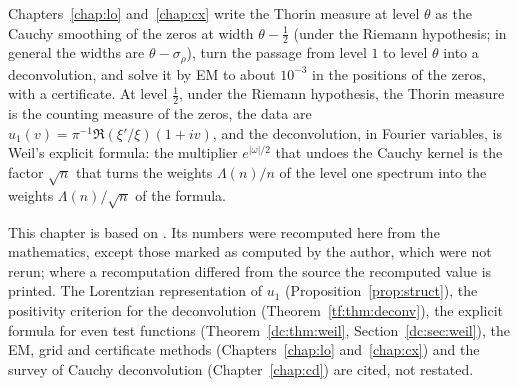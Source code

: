 \label{chap:es}

Chapters~\ref{chap:lo} and~\ref{chap:cx} write the Thorin measure at level $\theta$ as the Cauchy smoothing of the zeros at width $\theta-\tfrac12$ (under the Riemann hypothesis; in general the widths are $\theta-\sigma_\rho$), turn the passage from level $1$ to level $\theta$ into a deconvolution, and solve it by EM to about $10^{-3}$ in the positions of the zeros, with a certificate. At level $\tfrac12$, under the Riemann hypothesis, the Thorin measure is the counting measure of the zeros, the data are $u_1(v)=\pi^{-1}\Re(\xi'/\xi)(1+iv)$, and the deconvolution, in Fourier variables, is Weil's explicit formula: the multiplier $e^{|\omega|/2}$ that undoes the Cauchy kernel is the factor $\sqrt n$ that turns the weights $\Lambda(n)/n$ of the level one spectrum into the weights $\Lambda(n)/\sqrt n$ of the formula.

This chapter is based on \cite{P26es}. Its numbers were recomputed here from the mathematics, except those marked as computed by the author, which were not rerun; where a recomputation differed from the source the recomputed value is printed. The Lorentzian representation of $u_1$ (Proposition~\ref{prop:struct}), the positivity criterion for the deconvolution (Theorem~\ref{tf:thm:deconv}), the explicit formula for even test functions (Theorem~\ref{dc:thm:weil}, Section~\ref{dc:sec:weil}), the EM, grid and certificate methods (Chapters~\ref{chap:lo} and~\ref{chap:cx}) and the survey of Cauchy deconvolution (Chapter~\ref{chap:cd}) are cited, not restated.

